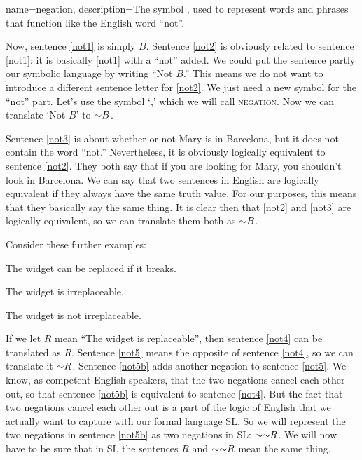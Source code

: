 {
name=negation,
description={The symbol \enot, used to represent words and phrases that function like the English word ``not''.}
}

Now, sentence \ref{not1} is simply $B$. Sentence \ref{not2} is obviously related to sentence \ref{not1}: it is basically \ref{not1} with a ``not'' added. We could put the sentence partly our symbolic language by writing ``Not $B$.'' This means we do not want to introduce a different sentence letter for \ref{not2}. We just need a new symbol for the ``not'' part. Let's use the symbol `\enot,' which we will call \textsc{\gls{negation}}. \label{def:negation} Now we can translate `Not $B$' to $\mathord{\sim} B$. 

Sentence \ref{not3} is about whether or not Mary is in Barcelona, but it does not contain the word 
``not.'' Nevertheless, it is obviously logically equivalent to sentence \ref{not2}. They both say that if 
you are looking for Mary, you shouldn't look in Barcelona.  We can say that two sentences in English are logically equivalent if they 
always have the same truth value. For our purposes, this means that they basically say the same thing. It 
is clear then that \ref{not2} and \ref{not3} are logically equivalent, so we can translate them both as 
$\mathord{\sim} B$.



Consider these further examples:
\begin{earg}
\item[\ex{not4}] The widget can be replaced if it breaks.
\item[\ex{not5}] The widget is irreplaceable.
\item[\ex{not5b}] The widget is not irreplaceable.
\end{earg}


If we let $R$ mean ``The widget is replaceable'', then sentence \ref{not4} can be translated as $R$. Sentence \ref{not5} means the opposite of sentence \ref{not4}, so we can translate it 
$\mathord{\sim} R$. Sentence \ref{not5b} adds another negation to sentence \ref{not5}. We know, as competent English speakers, that the two negations cancel each other out, so that sentence 
\ref{not5b} is equivalent to sentence \ref{not4}. But the fact that two negations cancel each other out is a part of the logic of English that we actually want to capture with our formal 
language SL. So we will represent the two negations in sentence \ref{not5b} as two negations in SL: $\mathord{\sim} \mathord{\sim} R$. We will now have to be sure that in SL the sentences $R$ and $\mathord{\sim} 
\mathord{\sim} R$ mean the same thing.

